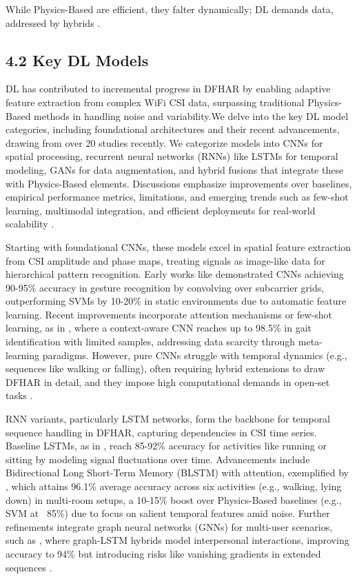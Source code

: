 \documentclass[Afour,sageh,times]{sagej}
\begin{document}
While Physics-Based are efficient, they falter dynamically; DL demands data, addressed by hybrids \citep{zou2019wifi}.

\subsection{4.2 Key DL Models}
\label{subsec:key_dl_models}

DL has contributed to incremental progress in  DFHAR by enabling adaptive feature extraction from complex WiFi CSI data, surpassing traditional Physics-Based methods in handling noise and variability.We delve into the key DL model categories, including foundational architectures and their recent advancements, drawing from over 20 studies recently. We categorize models into CNNs for spatial processing, recurrent neural networks (RNNs) like LSTMs for temporal modeling, GANs for data augmentation, and hybrid fusions that integrate these with Physics-Based elements. Discussions emphasize improvements over baselines, empirical performance metrics, limitations, and emerging trends such as few-shot learning, multimodal integration, and efficient deployments for real-world scalability \citep{zhou2022target, chen2018wifi, wang2022caution, yang2022deep}.

Starting with foundational CNNs, these models excel in spatial feature extraction from CSI amplitude and phase maps, treating signals as image-like data for hierarchical pattern recognition. Early works like \citep{mei2021wiwave} demonstrated CNNs achieving 90-95\% accuracy in gesture recognition by convolving over subcarrier grids, outperforming SVMs by 10-20\% in static environments due to automatic feature learning. Recent improvements incorporate attention mechanisms or few-shot learning, as in \citep{wang2022caution}, where a context-aware CNN reaches up to 98.5\% in gait identification with limited samples, addressing data scarcity through meta-learning paradigms. However, pure CNNs struggle with temporal dynamics (e.g., sequences like walking or falling), often requiring hybrid extensions to draw DFHAR in detail, and they impose high computational demands in open-set tasks \citep{yang2022deep}.

RNN variants, particularly LSTM networks, form the backbone for temporal sequence handling in DFHAR, capturing dependencies in CSI time series. Baseline LSTMs, as in \citep{islam2020wi}, reach 85-92\% accuracy for activities like running or sitting by modeling signal fluctuations over time. Advancements include Bidirectional Long Short-Term Memory (BLSTM) with attention, exemplified by \citep{chen2018wifi}, which attains 96.1\% average accuracy across six activities (e.g., walking, lying down) in multi-room setups, a 10-15\% boost over Physics-Based baselines (e.g., SVM at ~85\%) due to focus on salient temporal features amid noise. Further refinements integrate graph neural networks (GNNs) for multi-user scenarios, such as \citep{shen2022graph}, where graph-LSTM hybrids model interpersonal interactions, improving accuracy to 94\% but introducing risks like vanishing gradients in extended sequences \citep{wang2021multimodal}.
\end{document}
